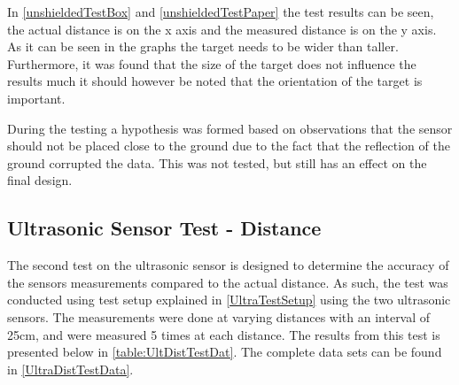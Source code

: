 



In \autoref{unshieldedTestBox} and \autoref{unshieldedTestPaper} the test
results can be seen, the actual distance is on the x axis and the measured
distance is on the y axis. As it can be seen in the graphs the target needs to
be wider than taller. Furthermore, it was found that the size of the target does
not influence the results much it should however be noted that the orientation
of the target is important. \nl
% 

During the testing a hypothesis was formed based on observations that the sensor
should not be placed close to the ground due to the fact that the reflection of
the ground corrupted the data. This was not tested, but still has an effect on the
final design. 

\subsection{Ultrasonic Sensor Test - Distance}
The second test on the ultrasonic sensor is designed to determine the accuracy
of the sensors measurements compared to the actual distance. As such, the test
was conducted using test setup explained in \autoref{UltraTestSetup} using the
two ultrasonic sensors. The measurements were done at varying distances with an
interval of 25cm, and were measured 5 times at each distance. The results from
this test is presented below in \autoref{table:UltDistTestDat}. The complete
data sets can be found in \autoref{UltraDistTestData}.

